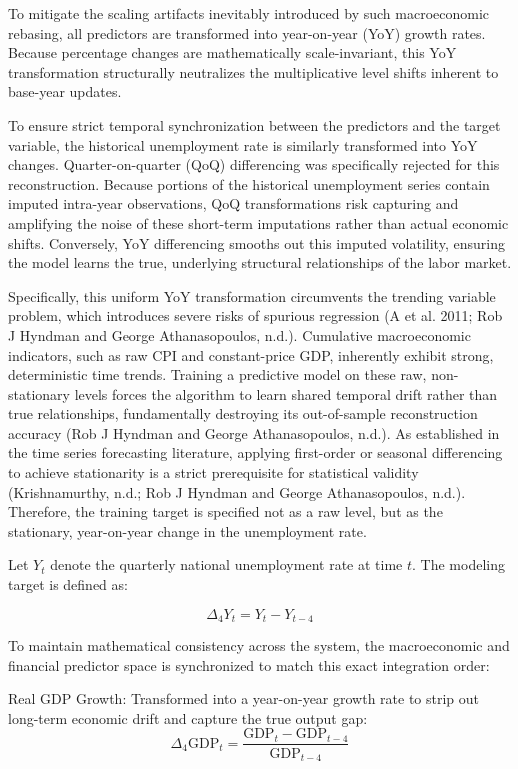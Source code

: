 \documentclass[
  letterpaper,
  DIV=11,
  numbers=noendperiod]{scrartcl}
\begin{document}
To mitigate the scaling artifacts inevitably introduced by such
macroeconomic rebasing, all predictors are transformed into year-on-year
(YoY) growth rates. Because percentage changes are mathematically
scale-invariant, this YoY transformation structurally neutralizes the
multiplicative level shifts inherent to base-year updates.

To ensure strict temporal synchronization between the predictors and the
target variable, the historical unemployment rate is similarly
transformed into YoY changes. Quarter-on-quarter (QoQ) differencing was
specifically rejected for this reconstruction. Because portions of the
historical unemployment series contain imputed intra-year observations,
QoQ transformations risk capturing and amplifying the noise of these
short-term imputations rather than actual economic shifts. Conversely,
YoY differencing smooths out this imputed volatility, ensuring the model
learns the true, underlying structural relationships of the labor
market.

Specifically, this uniform YoY transformation circumvents the trending
variable problem, which introduces severe risks of spurious regression
(A et al. 2011; Rob J Hyndman and George Athanasopoulos, n.d.).
Cumulative macroeconomic indicators, such as raw CPI and constant-price
GDP, inherently exhibit strong, deterministic time trends. Training a
predictive model on these raw, non-stationary levels forces the
algorithm to learn shared temporal drift rather than true relationships,
fundamentally destroying its out-of-sample reconstruction accuracy (Rob
J Hyndman and George Athanasopoulos, n.d.). As established in the time
series forecasting literature, applying first-order or seasonal
differencing to achieve stationarity is a strict prerequisite for
statistical validity (Krishnamurthy, n.d.; Rob J Hyndman and George
Athanasopoulos, n.d.). Therefore, the training target is specified not
as a raw level, but as the stationary, year-on-year change in the
unemployment rate.

Let \(Y_{t}\) denote the quarterly national unemployment rate at time
\(t\). The modeling target is defined as:

\[\Delta_4 Y_t = Y_t - Y_{t-4}\]

To maintain mathematical consistency across the system, the
macroeconomic and financial predictor space is synchronized to match
this exact integration order:

Real GDP Growth: Transformed into a year-on-year growth rate to strip
out long-term economic drift and capture the true output gap:
\[\Delta_4 \text{GDP}_t = \frac{\text{GDP}_t - \text{GDP}_{t-4}}{\text{GDP}_{t-4}}\]
\end{document}
